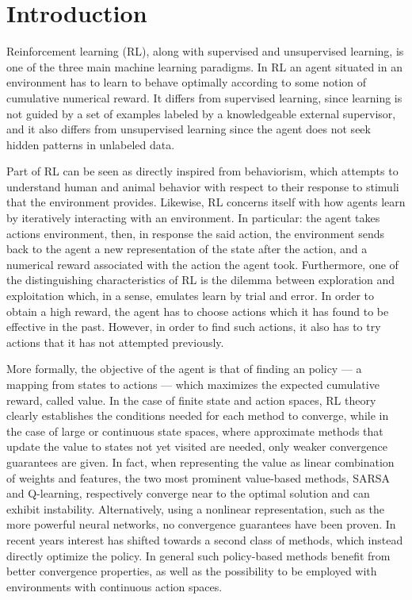 \chapter{Introduction}
Reinforcement learning (RL), along with supervised and unsupervised learning, is one of the three main machine learning paradigms. In RL an agent situated in an environment has to learn to behave optimally according to some notion of cumulative numerical reward. It differs from supervised learning, since learning is not guided by a set of examples labeled by a knowledgeable external supervisor, and it also differs from unsupervised learning since the agent does not seek hidden patterns in unlabeled data.

Part of RL can be seen as directly inspired from behaviorism, which attempts to understand human and animal behavior with respect to their response to stimuli that the environment provides. Likewise, RL concerns itself with how agents learn by iteratively interacting with an environment. In particular: the agent takes actions environment, then, in response the said action, the environment sends back to the agent a new representation of the state after the action, and a numerical reward associated with the action the agent took. Furthermore, one of the distinguishing characteristics of RL is the dilemma between exploration and exploitation which, in a sense, emulates learn by trial and error. In order to obtain a high reward, the agent has to choose actions which it has found to be effective in the past. However, in order to find such actions, it also has to try actions that it has not attempted previously.

More formally, the objective of the agent is that of finding an policy --- a mapping from states to actions --- which maximizes the expected cumulative reward, called value. In the case of finite state and action spaces, RL theory clearly establishes the conditions needed for each method to converge, while in the case of large or continuous state spaces, where approximate methods that update the value to states not yet visited are needed, only weaker convergence guarantees are given. In fact, when representing the value as linear combination of weights and features, the two most prominent value-based methods, SARSA and Q-learning, respectively converge near to the optimal solution and can exhibit instability. Alternatively, using a nonlinear representation, such as the more powerful neural networks, no convergence guarantees have been proven. In recent years interest has shifted towards a second class of methods, which instead directly optimize the policy. In general such policy-based methods benefit from better convergence properties, as well as the possibility to be employed with environments with continuous action spaces.

